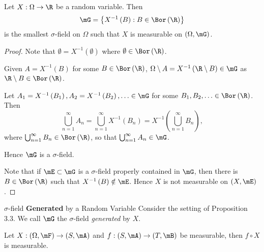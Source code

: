 \documentclass[stat901]{subfiles}
\begin{document}
    \rruleline

    \begin{prop}{}
        Let $X:\Omega\to\R$ be a random variable. Then
        \begin{equation*}
            \mG = \left\lbrace X^{-1}\left( B \right):B\in\Bor\left( \R \right) \right\rbrace
        \end{equation*}
        is the smallest $\sigma$-field on $\Omega$ such that $X$ is measurable on $\left( \Omega,\mG \right)$.
    \end{prop}

    \begin{proof}
        Note that $\emptyset = X^{-1}\left( \emptyset \right)$ where $\emptyset\in\Bor\left( \R \right)$.

        Given $A = X^{-1}\left( B \right)$ for some $B\in\Bor\left( \R \right)$, $\Omega\setminus A = X^{-1}\left( \R\setminus B \right)\in\mG$ as $\R\setminus B\in\Bor\left( \R \right)$.

        Let $A_1 = X^{-1}\left( B_1 \right), A_2 = X^{-1}\left( B_2 \right), \ldots\in\mG$ for some $B_1,B_2,\ldots\in\Bor\left( \R \right)$. Then
        \begin{equation*}
            \bigcup^{\infty}_{n=1} A_n = \bigcup^{\infty}_{n=1}X^{-1}\left( B_n \right) = X^{-1}\left( \bigcup^{\infty}_{n=1}B_n \right),
        \end{equation*}
        where $\bigcup^{\infty}_{n=1}B_n\in\Bor\left( \R \right)$, so that $\bigcup^{\infty}_{n=1}A_n\in\mG$.

        Hence $\mG$ is a $\sigma$-field.

        Note that if $\mE\subset\mG$ is a $\sigma$-field properly contained in $\mG$, then there is $B\in\Bor\left( \R \right)$ such that $X^{-1}\left( B \right)\notin\mE$. Hence $X$ is not measurable on $\left( X,\mE \right)$.
    \end{proof}

    \begin{definition}{$\sigma$-field \textbf{Generated} by a Random Variable}
        Consider the setting of Proposition 3.3. We call $\mG$ the $\sigma$-field \emph{generated} by $X$.
    \end{definition}

    \begin{theorem}{}
        Let $X:\left( \Omega,\mF \right)\to\left( S,\mA \right)$ and $f:\left( S,\mA \right)\to\left( T,\mB \right)$ be measurable, then $f\circ X$ is measurable.
    \end{theorem}
\end{document}

